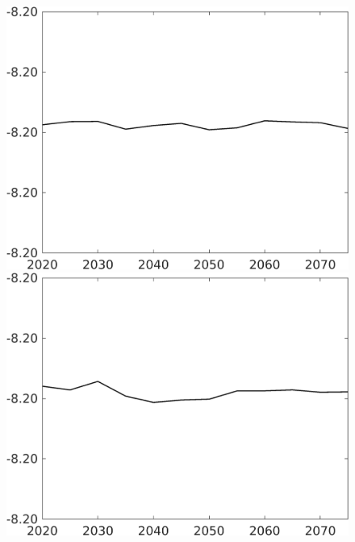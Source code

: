\documentclass[12pt]{article}
\begin{document}
\begin{figure}[h!!]
\begin{minipage}[]{0.32\textwidth}
	\end{minipage}	
\begin{minipage}[]{0.32\textwidth}
\includegraphics[width=1\textwidth]{../../codding_model/own_basedOnFried/optimalPol_010922_revision/figures/all_13Sept22/CompTaul_LFBAUPer_Reg0_F_spillover0_nsk1_xgr1_knspil1_sep1_countec0_GovRev0_etaa0.79.png}
\end{minipage}	
\begin{minipage}[]{0.32\textwidth}
\includegraphics[width=1\textwidth]{../../codding_model/own_basedOnFried/optimalPol_010922_revision/figures/all_13Sept22/CompTaul_LFBAUPer_Reg0_G_spillover0_nsk1_xgr1_knspil1_sep1_countec0_GovRev0_etaa0.79.png}

\end{minipage}
\end{figure}
\end{document}
